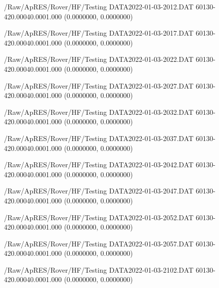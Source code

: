 \hfaprestable
{/Raw/ApRES/Rover/HF/Testing}%
{DATA2022-01-03-2012.DAT}%
{60}{1}{30}{-4}{20.000}{40.000}{1.000}%
{ (0.0000000, 0.0000000)}%
{}%
{}%

\hfaprestable
{/Raw/ApRES/Rover/HF/Testing}%
{DATA2022-01-03-2017.DAT}%
{60}{1}{30}{-4}{20.000}{40.000}{1.000}%
{ (0.0000000, 0.0000000)}%
{}%
{}%

\hfaprestable
{/Raw/ApRES/Rover/HF/Testing}%
{DATA2022-01-03-2022.DAT}%
{60}{1}{30}{-4}{20.000}{40.000}{1.000}%
{ (0.0000000, 0.0000000)}%
{}%
{}%

\hfaprestable
{/Raw/ApRES/Rover/HF/Testing}%
{DATA2022-01-03-2027.DAT}%
{60}{1}{30}{-4}{20.000}{40.000}{1.000}%
{ (0.0000000, 0.0000000)}%
{}%
{}%

\hfaprestable
{/Raw/ApRES/Rover/HF/Testing}%
{DATA2022-01-03-2032.DAT}%
{60}{1}{30}{-4}{20.000}{40.000}{1.000}%
{ (0.0000000, 0.0000000)}%
{}%
{}%

\hfaprestable
{/Raw/ApRES/Rover/HF/Testing}%
{DATA2022-01-03-2037.DAT}%
{60}{1}{30}{-4}{20.000}{40.000}{1.000}%
{ (0.0000000, 0.0000000)}%
{}%
{}%

\hfaprestable
{/Raw/ApRES/Rover/HF/Testing}%
{DATA2022-01-03-2042.DAT}%
{60}{1}{30}{-4}{20.000}{40.000}{1.000}%
{ (0.0000000, 0.0000000)}%
{}%
{}%

\hfaprestable
{/Raw/ApRES/Rover/HF/Testing}%
{DATA2022-01-03-2047.DAT}%
{60}{1}{30}{-4}{20.000}{40.000}{1.000}%
{ (0.0000000, 0.0000000)}%
{}%
{}%

\hfaprestable
{/Raw/ApRES/Rover/HF/Testing}%
{DATA2022-01-03-2052.DAT}%
{60}{1}{30}{-4}{20.000}{40.000}{1.000}%
{ (0.0000000, 0.0000000)}%
{}%
{}%

\hfaprestable
{/Raw/ApRES/Rover/HF/Testing}%
{DATA2022-01-03-2057.DAT}%
{60}{1}{30}{-4}{20.000}{40.000}{1.000}%
{ (0.0000000, 0.0000000)}%
{}%
{}%

\hfaprestable
{/Raw/ApRES/Rover/HF/Testing}%
{DATA2022-01-03-2102.DAT}%
{60}{1}{30}{-4}{20.000}{40.000}{1.000}%
{ (0.0000000, 0.0000000)}%
{}%
{}%

